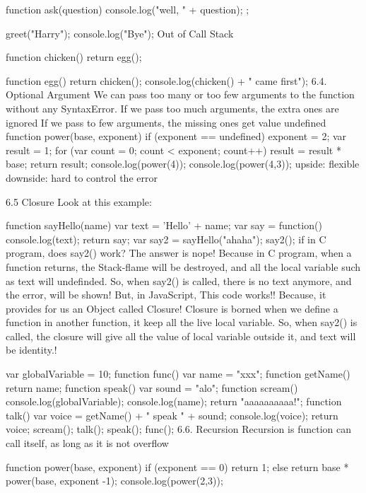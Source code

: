 function ask(question) {
    console.log("well, " + question);
};

greet("Harry");
console.log("Bye");
Out of Call Stack

function chicken() {
    return egg();
}

function egg() {
    return chicken();
}
console.log(chicken() + " came first");
6.4. Optional Argument
We can pass too many or too few arguments to the function without any SyntaxError.
If we pass too much arguments, the extra ones are ignored
If we pass to few arguments, the missing ones get value undefined
function power(base, exponent) {
    if (exponent == undefined) {
        exponent = 2;
    }
    var result = 1;
    for (var count = 0; count < exponent; count++) {
        result = result * base;
    }
    return result;
}
console.log(power(4));
console.log(power(4,3));
upside: flexible
downside: hard to control the error

6.5 Closure
Look at this example:

function sayHello(name){
    var text = 'Hello' + name;
    var say = function(){
        console.log(text);
    }
    return say;
}
var say2 = sayHello("ahaha");
say2();
if in C program, does say2() work?
The answer is nope! Because in C program, when a function returns, the Stack-flame will be destroyed, and all the local variable such as text will undefinded. So, when say2() is called, there is no text anymore, and the error, will be shown!
But, in JavaScript, This code works!! Because, it provides for us an Object called Closure! Closure is borned when we define a function in another function, it keep all the live local variable. So, when say2() is called, the closure will give all the value of local variable outside it, and text will be identity.!

var globalVariable = 10;
function func(){
    var name = "xxx";
    function getName(){
        return name;
    }
    function speak(){
        var sound = "alo";
        function scream(){
            console.log(globalVariable);
            console.log(name);
            return "aaaaaaaaaa!";
        }
        function talk(){
            var voice = getName() + " speak " + sound;
            console.log(voice);
            return voice;
        }
        scream();
        talk();
    }
    speak();
}
func();
6.6. Recursion
Recursion is function can call itself, as long as it is not overflow

function power(base, exponent){
    if (exponent == 0){
        return 1;
    }
    else{
        return base * power(base, exponent -1);
    }
}
console.log(power(2,3));

